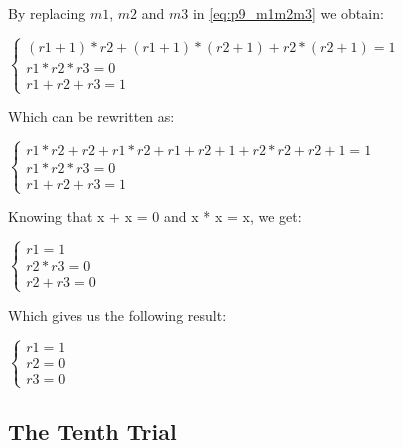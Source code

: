 By replacing $m1$, $m2$ and $m3$ in \ref{eq:p9_m1m2m3} we obtain:

\begin{center}
\begin{math}
\begin{cases}
 (r1 + 1) * r2 + (r1 + 1) * (r2 + 1) + r2 * (r2 + 1) = 1\\
 r1 * r2 * r3  = 0\\
 r1 + r2 + r3  = 1
\end{cases}
\end{math} 
\end{center}

Which can be rewritten as: 

\begin{center}
\begin{math}
\begin{cases}
 r1 * r2 + r2 + r1 * r2 + r1 + r2 + 1 + r2 * r2 + r2 + 1 = 1\\
 r1 * r2 * r3  = 0\\
 r1 + r2 + r3  = 1
\end{cases}
\end{math} 
\end{center}

Knowing that x + x = 0 and x * x = x, we get:

\begin{center}
\begin{math}
\begin{cases}
 r1 = 1\\
 r2 * r3 = 0\\
 r2 + r3 = 0
\end{cases}
\end{math} 
\end{center}

Which gives us the following result:

\begin{center}
\begin{math}
\begin{cases}
 r1 = 1\\
 r2 = 0\\
 r3 = 0
\end{cases}
\end{math} 
\end{center}







\subsection{The Tenth Trial}


